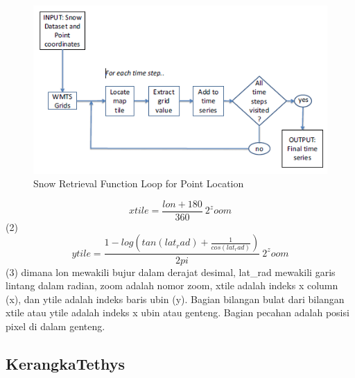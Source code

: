 \begin{figure}[ht]

\centerline{\includegraphics[width=1\textwidth]{figures/figures1_wmts.png}}

\caption{Snow Retrieval Function Loop for Point Location}

\label{figures1_wmts}

\end{figure}

\begin{equation}
	    xtile = \frac{lon + 180}{360} \ 2^zoom 
\end{equation}
(2)
\begin{equation}
	    ytile =\frac{1-log (tan(lat_rad) + \frac{1}{cos(lat_rad)})}{2pi} \ 2^zoom 
\end{equation}
(3)
dimana lon mewakili bujur dalam derajat desimal, lat_rad mewakili garis lintang dalam radian, zoom adalah nomor zoom, xtile adalah 
indeks x column (x), dan ytile adalah indeks baris ubin (y). Bagian bilangan bulat dari bilangan xtile atau ytile adalah indeks x ubin 
atau genteng. Bagian pecahan adalah posisi pixel di dalam genteng. \cite{Kadlec2016Extracting} 

\subsection{KerangkaTethys}


